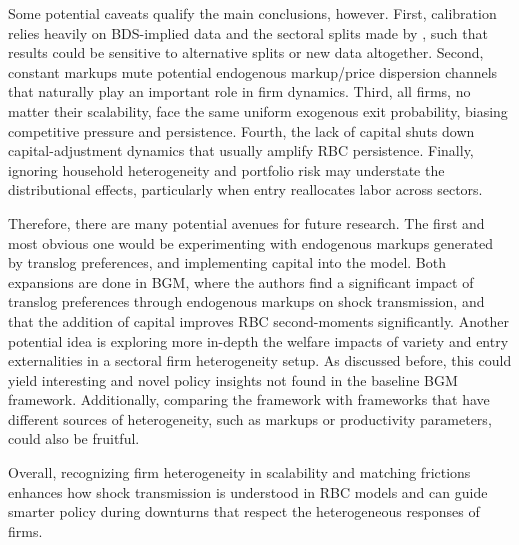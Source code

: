\documentclass[a4paper,12pt]{article} %
\numberwithin{equation}{section} %
\numberwithin{figure}{section}
\numberwithin{table}{section}
\begin{document}
Some potential caveats qualify the main conclusions, however. First, calibration relies heavily on BDS-implied data and the sectoral splits made by 
\textcite{sedlavcek2017growth}, such that results could be sensitive to alternative splits or new data altogether. Second, constant markups mute 
potential endogenous markup/price dispersion channels that naturally play an important role in firm dynamics. Third, all firms, no matter their scalability,
face the same uniform exogenous exit probability, biasing competitive pressure and persistence. Fourth, the lack of capital shuts down capital-adjustment
dynamics that usually amplify RBC persistence. Finally, ignoring household heterogeneity and portfolio risk may understate the distributional
effects, particularly when entry reallocates labor across sectors.

Therefore, there are many potential avenues for future research. The first and most obvious one would be experimenting with endogenous markups generated by
translog preferences, and implementing capital into the model. Both expansions are done in BGM, where the authors find a significant
impact of translog preferences through endogenous markups on shock transmission, and that the addition of capital improves RBC second-moments significantly.
Another potential idea is exploring more in-depth the welfare impacts of variety and entry externalities in a sectoral firm heterogeneity setup. As discussed before, 
this could yield interesting and novel policy insights not found in the baseline BGM framework. Additionally, comparing the framework with frameworks 
that have different sources of heterogeneity, such as markups or productivity parameters, could also be fruitful. 

Overall, recognizing firm heterogeneity in scalability and matching frictions enhances how 
shock transmission is understood in RBC models and can guide smarter policy during downturns that respect
the heterogeneous responses of firms. 



\newpage
\thispagestyle{plain}
\printbibliography[heading=bibintoc] %
\end{document}
